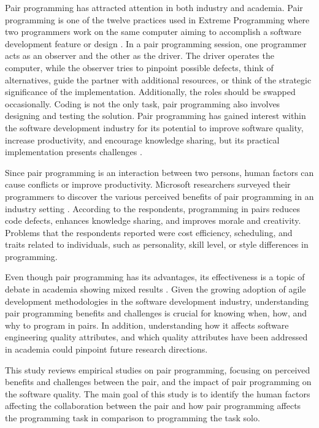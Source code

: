\documentclass[conference]{IEEEtran}
\begin{document}
Pair programming has attracted attention in both industry and academia. Pair programming is one of the twelve practices used in Extreme Programming where two programmers work on the same computer aiming to accomplish a software development feature or design \cite{10.5555/1076267}. In a pair programming session, one programmer acts as an observer and the other as the driver. The driver operates the computer, while the observer tries to pinpoint possible defects, think of alternatives, guide the partner with additional resources, or think of the strategic significance of the implementation. Additionally, the roles should be swapped occasionally. Coding is not the only task, pair programming also involves designing and testing the solution. Pair programming has gained interest within the software development industry for its potential to improve software quality, increase productivity, and encourage knowledge sharing, but its practical implementation presents challenges \cite{10.1145/2652524.2652529, Williams2000Strengthening}.

Since pair programming is an interaction between two persons, human factors can cause conflicts or improve productivity. Microsoft researchers surveyed their programmers to discover the various perceived benefits of pair programming in an industry setting \cite{10.1145/1414004.1414026}. According to the respondents, programming in pairs reduces code defects, enhances knowledge sharing, and improves morale and creativity. Problems that the respondents reported were cost efficiency, scheduling, and traits related to individuals, such as personality, skill level, or style differences in programming. 

Even though pair programming has its advantages, its effectiveness is a topic of debate in academia showing mixed results \cite{Hannay2009effectiveness}. Given the growing adoption of agile development methodologies in the software development industry, understanding pair programming benefits and challenges is crucial for knowing when, how, and why to program in pairs. In addition, understanding how it affects software engineering quality attributes, and which quality attributes have been addressed in academia could pinpoint future research directions.

This study reviews empirical studies on pair programming, focusing on perceived benefits and challenges between the pair, and the impact of pair programming on the software quality. The main goal of this study is to identify the human factors affecting the collaboration between the pair and how pair programming affects the programming task in comparison to programming the task solo.
\end{document}
